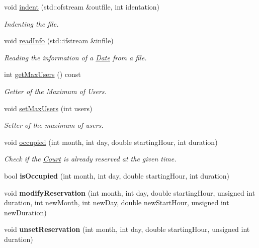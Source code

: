 \begin{DoxyCompactItemize}
void \mbox{\hyperlink{class_court_ae08f3e2f1119073fffc251fc1e725550}{indent}} (std\+::ofstream \&outfile, int identation)
\begin{DoxyCompactList}\small\item\em Indenting the file. \end{DoxyCompactList}\item 
void \mbox{\hyperlink{class_court_a2d801d3edd9d0280ef0420b131e07f2e}{read\+Info}} (std\+::ifstream \&infile)
\begin{DoxyCompactList}\small\item\em Reading the information of a \mbox{\hyperlink{class_date}{Date}} from a file. \end{DoxyCompactList}\item 
int \mbox{\hyperlink{class_court_a9992ef2a5d2ee81e8cc7f24f8c917f31}{get\+Max\+Users}} () const
\begin{DoxyCompactList}\small\item\em Getter of the Maximum of Users. \end{DoxyCompactList}\item 
void \mbox{\hyperlink{class_court_ae44417638404c3caf4579104e633a2f4}{set\+Max\+Users}} (int users)
\begin{DoxyCompactList}\small\item\em Setter of the maximum of users. \end{DoxyCompactList}\item 
void \mbox{\hyperlink{class_court_abb97f1c2df77bd02e788ac7d4709eaa8}{occupied}} (int month, int day, double starting\+Hour, int duration)
\begin{DoxyCompactList}\small\item\em Check if the \mbox{\hyperlink{class_court}{Court}} is already reserved at the given time. \end{DoxyCompactList}\item 
\mbox{\label{class_court_ae4536a06bcc2aec8a144d134ae64f2e6}} 
bool {\bfseries is\+Occupied} (int month, int day, double starting\+Hour, int duration)
\item 
\mbox{\label{class_court_ac8ca7155497bdf17742b013b39c7ac3f}} 
void {\bfseries modify\+Reservation} (int month, int day, double starting\+Hour, unsigned int duration, int new\+Month, int new\+Day, double new\+Start\+Hour, unsigned int new\+Duration)
\item 
\mbox{\label{class_court_a5041b8a1dd8463f4b184497a63f718f0}} 
void {\bfseries unset\+Reservation} (int month, int day, double starting\+Hour, unsigned int duration)
\end{DoxyCompactItemize}


